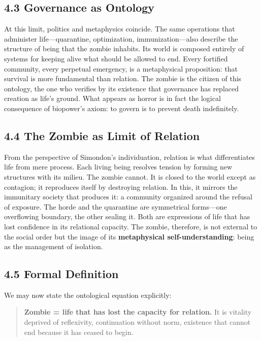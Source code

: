 \documentclass[11pt]{article}
\begin{document}
\subsection*{4.3 Governance as Ontology}
\label{sec:org199faf1}

At this limit, politics and metaphysics coincide. The same operations that administer life—quarantine, optimization, immunization—also describe the structure of being that the zombie inhabits. Its world is composed entirely of systems for keeping alive what should be allowed to end. Every fortified community, every perpetual emergency, is a metaphysical proposition: that survival is more fundamental than relation. The zombie is the citizen of this ontology, the one who verifies by its existence that governance has replaced creation as life’s ground. What appears as horror is in fact the logical consequence of biopower’s axiom: to govern is to prevent death indefinitely.
\subsection*{4.4 The Zombie as Limit of Relation}
\label{sec:org6616014}

From the perspective of Simondon’s individuation, relation is what differentiates life from mere process. Each living being resolves tension by forming new structures with its milieu. The zombie cannot. It is closed to the world except as contagion; it reproduces itself by destroying relation. In this, it mirrors the immunitary society that produces it: a community organized around the refusal of exposure. The horde and the quarantine are symmetrical forms—one overflowing boundary, the other sealing it. Both are expressions of life that has lost confidence in its relational capacity. The zombie, therefore, is not external to the social order but the image of its \textbf{metaphysical self-understanding}: being as the management of isolation.
\subsection*{4.5 Formal Definition}
\label{sec:orga671f98}

We may now state the ontological equation explicitly:

\begin{quote}
\textbf{Zombie = life that has lost the capacity for relation.}
It is vitality deprived of reflexivity, continuation without norm, existence that cannot end because it has ceased to begin.
\end{quote}
\end{document}
